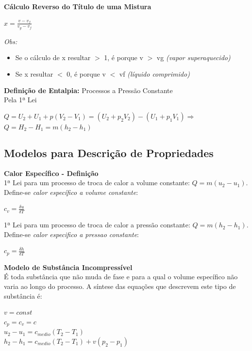 \documentclass[a4paper, 12pt]{article}
\begin{document}
\textbf{Cálculo Reverso do Título de uma Mistura}
	\begin{center}
		\large
		$ x = \frac{v - v_f}{v_g - v_f} $
	\end{center}

\textit{Obs:}
	\begin{itemize}
		\item Se o cálculo de x resultar $ > $ 1, é porque v $ > $ vg \textit{(vapor superaquecido)}
		
		\item Se x resultar $ < $ 0, é porque v $ < $ vf \textit{(líquido comprimido)}
	\end{itemize}

\textbf{Definição de Entalpia:} Processos a Pressão Constante\\
Pela 1ª Lei
	\begin{center}
		\large
		$ Q = U_2 + U_1 + p(V_2-V_1)  = (U_2+p_2V_2) - (U_1+p_1V_1) \Rightarrow$\\
		$ Q = H_2-H_1 = m(h_2-h_1) $
	\end{center}

\subsection{Modelos para Descrição de Propriedades}
\textbf{Calor Específico - Definição}\\
1ª Lei para um processo de troca de calor a volume constante: $ Q = m(u_2-u_1)$. Define-se \textit{calor específico a volume constante}:
	\begin{center}
		\large
		$ c_v = \frac{\delta u}{\delta T} $
	\end{center}

1ª Lei para um processo de troca de calor a pressão constante: $ Q = m(h_2-h_1) $. Define-se \textit{calor especifico a pressao constante}:
	\begin{center}
		\large
		$ c_p = \frac{\delta h}{\delta T} $
	\end{center}

\textbf{Modelo de Substância Incompressível}\\
É toda substância que não muda de fase e para a qual o volume específico não varia ao longo do processo.
A síntese das equações que descrevem este tipo de substância é:
	\begin{center}
		\large
		$ v = const $\\
		$ c_p = c_v = c $\\
		$ u_2 - u_1 = c_{medio}(T_2 - T_1) $\\
		$ h_2 - h_1 = c_{medio}(T_2-T_1) + v(p_2-p_1) $
	\end{center}
\end{document}
